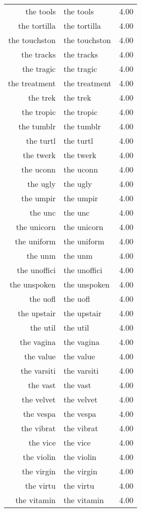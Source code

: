 \begin{table}[ht]
\begin{tabular}{rlr}
  the tools & the tools & 4.00 \\ 
  the tortilla & the tortilla & 4.00 \\ 
  the touchston & the touchston & 4.00 \\ 
  the tracks & the tracks & 4.00 \\ 
  the tragic & the tragic & 4.00 \\ 
  the treatment & the treatment & 4.00 \\ 
  the trek & the trek & 4.00 \\ 
  the tropic & the tropic & 4.00 \\ 
  the tumblr & the tumblr & 4.00 \\ 
  the turtl & the turtl & 4.00 \\ 
  the twerk & the twerk & 4.00 \\ 
  the uconn & the uconn & 4.00 \\ 
  the ugly & the ugly & 4.00 \\ 
  the umpir & the umpir & 4.00 \\ 
  the unc & the unc & 4.00 \\ 
  the unicorn & the unicorn & 4.00 \\ 
  the uniform & the uniform & 4.00 \\ 
  the unm & the unm & 4.00 \\ 
  the unoffici & the unoffici & 4.00 \\ 
  the unspoken & the unspoken & 4.00 \\ 
  the uofl & the uofl & 4.00 \\ 
  the upstair & the upstair & 4.00 \\ 
  the util & the util & 4.00 \\ 
  the vagina & the vagina & 4.00 \\ 
  the value & the value & 4.00 \\ 
  the varsiti & the varsiti & 4.00 \\ 
  the vast & the vast & 4.00 \\ 
  the velvet & the velvet & 4.00 \\ 
  the vespa & the vespa & 4.00 \\ 
  the vibrat & the vibrat & 4.00 \\ 
  the vice & the vice & 4.00 \\ 
  the violin & the violin & 4.00 \\ 
  the virgin & the virgin & 4.00 \\ 
  the virtu & the virtu & 4.00 \\ 
  the vitamin & the vitamin & 4.00 \\ 

\end{tabular}
\end{table}
